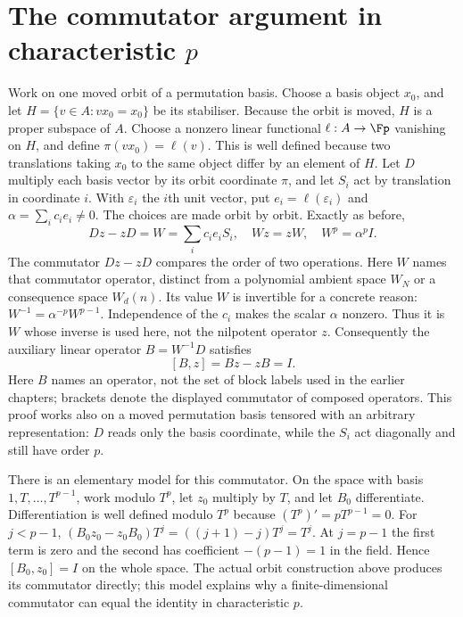 \documentclass[11pt,a4paper,oneside,openany]{book}
\theoremstyle{definition}\newtheorem{definition}[theorem]{Definition}
\theoremstyle{remark}\newtheorem{remark}[theorem]{Remark}
\numberwithin{equation}{chapter}
\begin{document}
\section{The commutator argument in characteristic \texorpdfstring{$p$}{p}}\label{tx:sec:commutatorp}
Work on one moved orbit of a permutation basis. Choose a basis
object $x_0$, and let $H=\{v\in A:vx_0=x_0\}$ be its stabiliser.
Because the orbit is moved, $H$ is a proper subspace of $A$.
Choose a nonzero linear functional $\ell:A\to\Fp$ vanishing on
$H$, and define $\pi(vx_0)=\ell(v)$. This is well defined because
two translations taking $x_0$ to the same object differ by an
element of $H$. Let $D$ multiply each basis vector by its orbit
coordinate $\pi$, and let $S_i$ act by translation in coordinate
$i$. With $\varepsilon_i$ the $i$th unit vector, put
$e_i=\ell(\varepsilon_i)$ and $\alpha=\sum_i c_ie_i\ne0$.
The choices are made orbit by orbit. Exactly as before,
\[Dz-zD=W=\sum_i c_ie_iS_i,\quad Wz=zW,\quad W^p=\alpha^pI.
\]
The commutator $Dz-zD$ compares the order of two operations.
Here $W$ names that commutator operator, distinct from a polynomial
ambient space $W_N$ or a consequence space $W_d(n)$.
Its value $W$ is invertible for a concrete reason:
$W^{-1}=\alpha^{-p}W^{p-1}$. Independence of the $c_i$ makes the
scalar $\alpha$ nonzero. Thus it is $W$ whose inverse is used here,
not the nilpotent operator $z$.
Consequently the auxiliary linear operator $B=W^{-1}D$ satisfies
\begin{equation}\label{tx:eq:commutator}[B,z]=Bz-zB=I.\end{equation}
Here $B$ names an operator, not the set of block labels used in the
earlier chapters; brackets denote the displayed commutator of
composed operators.
This proof works also on a moved permutation basis tensored with an arbitrary representation: $D$ reads only the basis coordinate, while the $S_i$ act diagonally and still have order $p$.

There is an elementary model for this commutator. On the space with
basis $1,T,\ldots,T^{p-1}$, work modulo $T^p$, let $z_0$ multiply
by $T$, and let $B_0$ differentiate. Differentiation is well defined
modulo $T^p$ because $(T^p)'=pT^{p-1}=0$. For $j<p-1$,
$(B_0z_0-z_0B_0)T^j=((j+1)-j)T^j=T^j$.
At $j=p-1$ the first term is zero and the second has coefficient
$-(p-1)=1$ in the field. Hence $[B_0,z_0]=I$ on the whole space.
The actual orbit construction above produces its commutator directly;
this model explains why a finite-dimensional commutator can equal the
identity in characteristic $p$.
\end{document}

